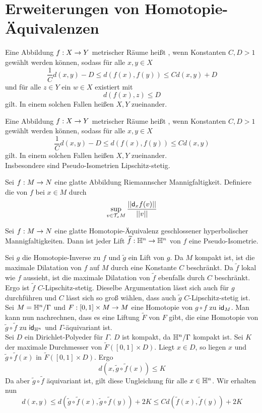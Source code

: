 \documentclass{book}
\renewcommand{\d}{\textsf{d}}
\begin{document}
\section{Erweiterungen von Homotopie-Äquivalenzen}
\Def{}
Eine Abbildung $f : X \overset{}{\rightarrow} Y$ metrischer Räume heißt , wenn Konstanten $C,D > 1$ gewählt werden können, sodass für alle $x,y \in X$
\[ \frac{1}{C}d(x,y) - D \leq d(f(x),f(y)) \leq C d(x,y) + D \]
und für alle $z \in Y$ ein $w \in X$ existiert mit
\[ d(f(x),z) \leq D \]
gilt. In einem solchen Fallen heißen $X,Y$  zueinander.

\Def{}
Eine Abbildung $f : X \overset{}{\rightarrow} Y$ metrischer Räume heißt , wenn Konstanten $C,D > 1$ gewählt werden können, sodass für alle $x,y \in X$
\[ \frac{1}{C}d(x,y) - D \leq d(f(x),f(y)) \leq C d(x,y) \]
gilt. In einem solchen Fallen heißen $X,Y$  zueinander.\\
Insbesondere sind Pseudo-Isometrien Lipschitz-stetig.

\Def{}
Sei $f : M \overset{}{\rightarrow} N$ eine glatte Abbildung Riemannscher Mannigfaltigkeit. Definiere die  von $f$ bei $x\in M$ durch
\[ \sup_{v \in \T_xM} \frac{\norm{\d_xf(v)}}{\norm{v}}  \]

\Prop{}
Sei $f : M \overset{}{\rightarrow} N$ eine glatte Homotopie-Äquivalenz geschlossener hyperbolischer Mannigfaltigkeiten. Dann ist jeder Lift $\widetilde{f} : \mathbb{H}^n \overset{}{\rightarrow} \mathbb{H}^n$ von $f$ eine Pseudo-Isometrie.
\begin{Beweis}{}
	Sei $g$ die Homotopie-Inverse zu $f$ und $\widetilde{g}$ ein Lift von $g$. Da $M$ kompakt ist, ist die maximale Dilatation von $f$ auf $M$ durch eine Konstante $C$ beschränkt. Da $\widetilde{f}$ lokal wie $f$ aussieht, ist die maximale Dilatation von $\widetilde{f}$ ebenfalls durch $C$ beschränkt. Ergo ist $\widetilde{f}$ $C$-Lipschitz-stetig. Dieselbe Argumentation lässt sich auch für $g$ durchführen und $C$ lässt sich so groß wählen, dass auch $\widetilde{g}$ $C$-Lipschitz-stetig ist.\\
	Sei $M = \mathbb{H}^n / \Gamma$ und $F : [0,1] \times M \overset{}{\rightarrow} M$ eine Homotopie von $g\circ f $ zu $\textsf{id}_{M}$. Man kann nun nachrechnen, dass es eine Liftung $\widetilde{F}$ von $F$ gibt, die eine Homotopie von $\widetilde{g} \circ \widetilde{f}$ zu $\textsf{id}_{\mathbb{H}^n}$ und $\Gamma$-äquivariant ist.\\
	Sei $D$ ein Dirichlet-Polyeder für $\Gamma$. $D$ ist kompakt, da $\mathbb{H}^n / \Gamma$ kompakt ist. Sei $K$ der maximale Durchmesser von $\widetilde{F}([0,1]\times D)$. Liegt $x \in D$, so liegen $x$ und $\widetilde{g} \circ \widetilde{f}(x)$ in $\widetilde{F}([0,1]\times D)$. Ergo
	\[ d(x, \widetilde{g} \circ \widetilde{f} (x)) \leq K \]
	Da aber $\widetilde{g} \circ \widetilde{f}$ äquivariant ist, gilt diese Ungleichung für alle $x \in \mathbb{H}^n$. Wir erhalten nun
	\[ d(x,y) \leq d(\widetilde{g} \circ \widetilde{f} (x),\widetilde{g} \circ \widetilde{f}(y)) + 2K \leq C d(\widetilde{f}(x),\widetilde{f}(y)) + 2K \]
\end{Beweis}
\end{document}
